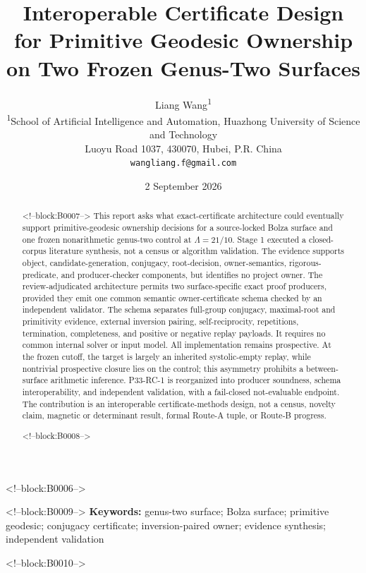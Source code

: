 \documentclass[11pt,a4paper]{article}
\title{Interoperable Certificate Design for Primitive Geodesic Ownership on Two Frozen Genus-Two Surfaces}
\author{Liang Wang\textsuperscript{1}\\
\small \textsuperscript{1}School of Artificial Intelligence and Automation, Huazhong University of Science and Technology\\
\small Luoyu Road 1037, 430070, Hubei, P.R. China\\
\small \texttt{wangliang.f@gmail.com}}
\date{2 September 2026}
\begin{document}
\maketitle

<!--block:B0006-->
\begin{abstract}

<!--block:B0007-->
This report asks what exact-certificate architecture could eventually support primitive-geodesic ownership decisions for a source-locked Bolza surface and one frozen nonarithmetic genus-two control at \(\Lambda=21/10\). Stage 1 executed a closed-corpus literature synthesis, not a census or algorithm validation. The evidence supports object, candidate-generation, conjugacy, root-decision, owner-semantics, rigorous-predicate, and producer-checker components, but identifies no project owner. The review-adjudicated architecture permits two surface-specific exact proof producers, provided they emit one common semantic owner-certificate schema checked by an independent validator. The schema separates full-group conjugacy, maximal-root and primitivity evidence, external inversion pairing, self-reciprocity, repetitions, termination, completeness, and positive or negative replay payloads. It requires no common internal solver or input model. All implementation remains prospective. At the frozen cutoff, the target is largely an inherited systolic-empty replay, while nontrivial prospective closure lies on the control; this asymmetry prohibits a between-surface arithmetic inference. P33-RC-1 is reorganized into producer soundness, schema interoperability, and independent validation, with a fail-closed not-evaluable endpoint. The contribution is an interoperable certificate-methods design, not a census, novelty claim, magnetic or determinant result, formal Route-A tuple, or Route-B progress.

<!--block:B0008-->
\end{abstract}

<!--block:B0009-->
\noindent\textbf{Keywords:} genus-two surface; Bolza surface; primitive geodesic; conjugacy certificate; inversion-paired owner; evidence synthesis; independent validation

<!--block:B0010-->
\end{document}
